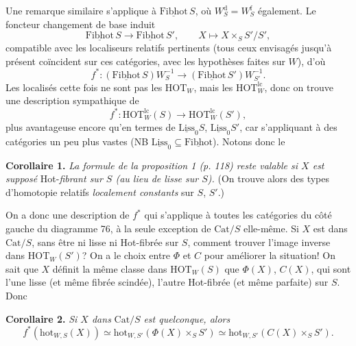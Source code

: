 \documentclass[11pt]{article}
\newcommand{\printedpage}[1]{\marginpar{\footnotesize p.~#1}}
\newcommand{\msp}[1]{\marginpar{\footnotesize [#1]}}
\newcommand{\und}[1]{\underline{\mathrm{#1}}}
\newcommand{\HOT}{\mathrm{HOT}}
\newcommand{\hot}{\mathrm{hot}}
\newcommand{\Cat}{\mathrm{Cat}}
\begin{document}
\printedpage{74}

\msp{page 119}
Une remarque similaire s'applique à $\und{Fibhot}\,S$, où $W_S^{\mathrm{d}} = W_S^{\mathrm{f}}$ également. Le foncteur changement de base induit
\[
\und{Fibhot}\,S \longrightarrow \und{Fibhot}\,S', \qquad X \longmapsto X \times_S S'/S',
\]
compatible avec les localiseurs relatifs pertinents (tous ceux envisagés jusqu'à présent coïncident sur ces catégories, avec les hypothèses faites sur $W$), d'où
\[
f^* : (\und{Fibhot}\,S)W_S^{-1} \longrightarrow (\und{Fibhot}\,S')W_{S'}^{-1}.
\]
Les localisés cette fois ne sont pas les $\HOT_W$, mais les $\HOT_W^{\mathrm{lc}}$, donc on trouve une description sympathique de
\[
f^* : \HOT_W^{\mathrm{lc}}(S) \longrightarrow \HOT_W^{\mathrm{lc}}(S'),
\]
plus avantageuse encore qu'en termes de $\und{Liss}_0S$, $\und{Liss}_0S'$, car s'appliquant à des catégories un peu plus vastes (NB $\und{Liss}_0 \subseteq \und{Fibhot}$). Notons donc le

\textbf{Corollaire 1.} \textit{La formule de la proposition 1 (p. 118) reste valable si $X$ est supposé} Hot-\textit{fibrant sur $S$ (au lieu de lisse sur $S$).} (On trouve alors des types d'homotopie relatifs \textit{localement constants} sur $S$, $S'$.)

On a donc une description de $f^*$ qui s'applique à toutes les catégories du côté gauche
\msp{page 120}
du diagramme 76, à la seule exception de $\Cat/S$ elle-même. Si $X$ est dans $\Cat/S$, sans être ni lisse ni Hot-fibrée sur $S$, comment trouver l'image inverse dans $\HOT_W(S')$? On a le choix entre $\Phi$ et $C$ pour améliorer la situation! On sait que $X$ définit la même classe dans $\HOT_W(S)$ que $\Phi(X)$, $C(X)$, qui sont l'une lisse (et même fibrée scindée), l'autre Hot-fibrée (et même parfaite) sur $S$. Donc

\textbf{Corollaire 2.} \textit{Si $X$ dans} $\Cat/S$ \textit{est quelconque, alors}
\[
f^*(\hot_{W,S}(X)) \simeq \hot_{W,S'}(\Phi(X) \times_S S') \simeq \hot_{W,S'}(C(X) \times_S S').
\]

\bigskip
\end{document}
